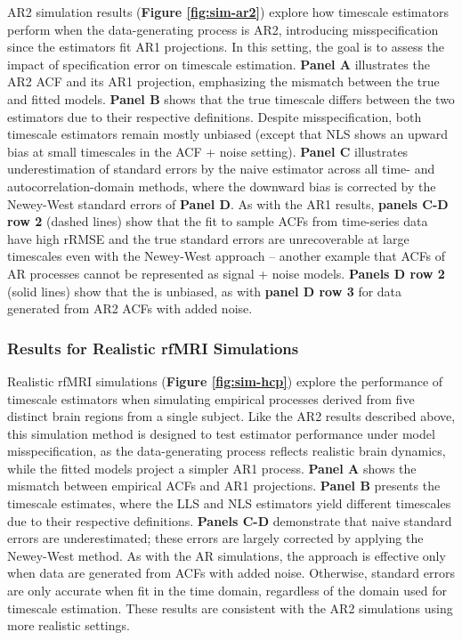 \documentclass[latex/main.tex]{subfiles}
\begin{document}
AR2 simulation results (\textbf{Figure \ref{fig:sim-ar2}}) explore how timescale estimators perform when the data-generating process is AR2, introducing misspecification since the estimators fit AR1 projections. In this setting, the goal is to assess the impact of specification error on timescale estimation. \textbf{Panel A} illustrates the AR2 ACF and its AR1 projection, emphasizing the mismatch between the true and fitted models. \textbf{Panel B} shows that the true timescale differs between the two estimators due to their respective definitions. Despite misspecification, both timescale estimators remain mostly unbiased (except that NLS shows an upward bias at small timescales in the ACF + noise setting). \textbf{Panel C} illustrates underestimation of standard errors by the naive estimator across all time- and autocorrelation-domain methods, where the downward bias is corrected by the Newey-West standard errors of \textbf{Panel D}. As with the AR1 results, \textbf{panels C-D row 2} (dashed lines) show that the  fit to sample ACFs from time-series data have high rRMSE and the true standard errors are unrecoverable at large timescales even with the Newey-West approach -- another example that ACFs of AR processes cannot be represented as signal + noise models. \textbf{Panels D row 2} (solid lines) show that the  is unbiased, as with  \textbf{panel D row 3} for data generated from AR2 ACFs with added noise.


\subsubsection{Results for Realistic rfMRI Simulations}

Realistic rfMRI simulations (\textbf{Figure \ref{fig:sim-hcp}}) explore the performance of timescale estimators when simulating empirical processes derived from five distinct brain regions from a single subject. Like the AR2 results described above, this simulation method is designed to test estimator performance under model misspecification, as the data-generating process reflects realistic brain dynamics, while the fitted models project a simpler AR1 process. \textbf{Panel A} shows the mismatch between empirical ACFs and AR1 projections. \textbf{Panel B} presents the timescale estimates, where the LLS and NLS estimators yield different timescales due to their respective definitions. \textbf{Panels C-D} demonstrate that naive standard errors are underestimated; these errors are largely corrected by applying the Newey-West method. As with the AR simulations, the  approach is effective only when data are generated from ACFs with added noise. Otherwise, standard errors are only accurate when fit in the time domain, regardless of the domain used for timescale estimation. These results are consistent with the AR2 simulations using more realistic settings.\\
\end{document}
